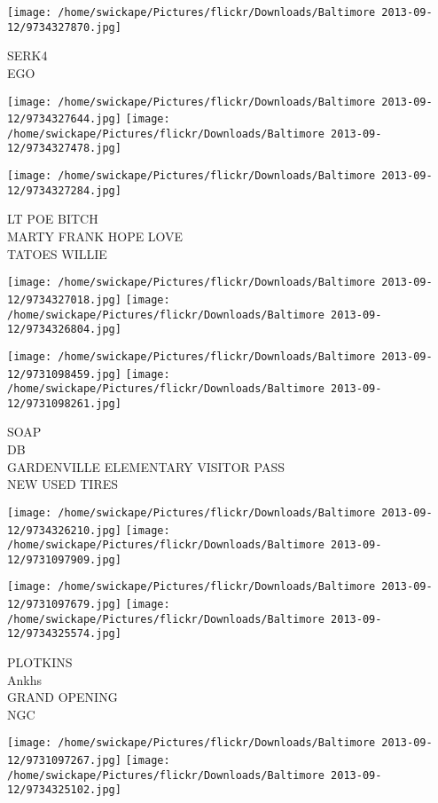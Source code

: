 \documentclass[10pt,letterpaper]{article}
\begin{document}
\vspace{0.25in}
\texttt{[image: /home/swickape/Pictures/flickr/Downloads/Baltimore 2013-09-12/9734327870.jpg]}

SERK4\\
EGO
\pagebreak

\texttt{[image: /home/swickape/Pictures/flickr/Downloads/Baltimore 2013-09-12/9734327644.jpg]}
\texttt{[image: /home/swickape/Pictures/flickr/Downloads/Baltimore 2013-09-12/9734327478.jpg]}

\vspace{0.25in}
\texttt{[image: /home/swickape/Pictures/flickr/Downloads/Baltimore 2013-09-12/9734327284.jpg]}

LT POE BITCH\\
MARTY FRANK HOPE LOVE\\
TATOES WILLIE
\pagebreak

\texttt{[image: /home/swickape/Pictures/flickr/Downloads/Baltimore 2013-09-12/9734327018.jpg]}
\texttt{[image: /home/swickape/Pictures/flickr/Downloads/Baltimore 2013-09-12/9734326804.jpg]}

\texttt{[image: /home/swickape/Pictures/flickr/Downloads/Baltimore 2013-09-12/9731098459.jpg]}
\texttt{[image: /home/swickape/Pictures/flickr/Downloads/Baltimore 2013-09-12/9731098261.jpg]}

SOAP\\
DB\\
GARDENVILLE ELEMENTARY VISITOR PASS\\
NEW USED TIRES
\pagebreak

\texttt{[image: /home/swickape/Pictures/flickr/Downloads/Baltimore 2013-09-12/9734326210.jpg]}
\texttt{[image: /home/swickape/Pictures/flickr/Downloads/Baltimore 2013-09-12/9731097909.jpg]}

\texttt{[image: /home/swickape/Pictures/flickr/Downloads/Baltimore 2013-09-12/9731097679.jpg]}
\texttt{[image: /home/swickape/Pictures/flickr/Downloads/Baltimore 2013-09-12/9734325574.jpg]}

PLOTKINS\\
Ankhs\\
GRAND OPENING\\
NGC
\pagebreak

\texttt{[image: /home/swickape/Pictures/flickr/Downloads/Baltimore 2013-09-12/9731097267.jpg]}
\texttt{[image: /home/swickape/Pictures/flickr/Downloads/Baltimore 2013-09-12/9734325102.jpg]}
\end{document}
